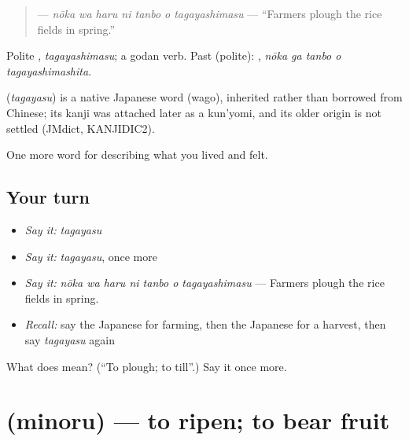 \begin{quote}
\textbf{   } — \emph{nōka wa haru ni tanbo o tagayashimasu} — \textquotedblleft{}Farmers plough the rice fields in spring.\textquotedblright{}
\end{quote}

Polite \textbf{}, \emph{tagayashimasu}; a godan verb. Past (polite): \textbf{  }, \emph{nōka ga tanbo o tagayashimashita}.

\begin{cousinweb}
\textbf{} (\emph{tagayasu}) is a native Japanese word (wago), inherited rather than borrowed from Chinese; its kanji was attached later as a kun'yomi, and its older origin is not settled (JMdict, KANJIDIC2).
\end{cousinweb}

\begin{grammarlens}[title={What you've built}]
One more word for describing what you lived and felt.
\end{grammarlens}

\subsection*{Your turn}
\begin{itemize}
\raggedright
  \item \emph{Say it:} \emph{tagayasu}
  \item \emph{Say it:} \emph{tagayasu}, once more
  \item \emph{Say it:} \emph{nōka wa haru ni tanbo o tagayashimasu} — Farmers plough the rice fields in spring.
  \item \emph{Recall:} say the Japanese for farming, then the Japanese for a harvest, then say \emph{tagayasu} again
\end{itemize}

\begin{tcolorbox}[breakable,colback=teal!4,colframe=teal!35!black,title={Before you move on}]
What does  mean? (\textquotedblleft{}To plough; to till\textquotedblright{}.) Say it once more.
\end{tcolorbox}
\section[\texorpdfstring{\ja{みのる} (minoru)}{みのる (minoru)}]{ (minoru) — to ripen; to bear fruit}

